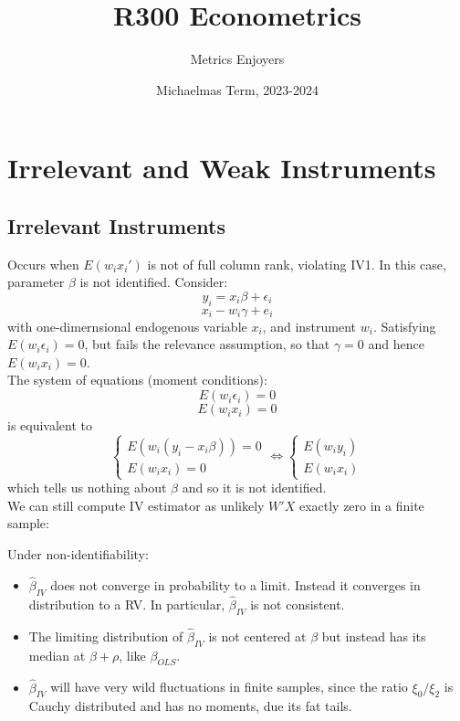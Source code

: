 \documentclass[DIV=14,titlepage=false]{scrreprt}
\title{%
R300 Econometrics}
\author{Metrics Enjoyers}
\date{Michaelmas Term, 2023-2024}
\begin{document}
\chapter{Irrelevant and Weak Instruments}

\section{Irrelevant Instruments}
Occurs when \(E(w_ix_i')\) is not of full column rank, violating IV1.
In this case, parameter \(\beta\) is not identified. Consider:
\[y_i=x_i\beta+\epsilon_i\]
\[x_i-w_i\gamma+e_i\]
with one-dimernsional endogenous variable \(x_i\), and instrument \(w_i\).
Satisfying \(E(w_i\epsilon_i)=0\), but fails the relevance assumption, so that \(\gamma=0\) and hence \(E(w_ix_i)=0\).
\\ The system of equations (moment conditions):
\[E(w_i\epsilon_i)=0\]
\[E(w_ix_i)=0\]
is equivalent to
\[\begin{cases} E(w_i(y_i-x_i\beta))=0 \\ E(w_ix_i)=0 \end{cases} \iff \begin{cases}E(w_iy_i) \\ E(w_ix_i)\end{cases}\]
which tells us nothing about \(\beta\) and so it is not identified.
\\
We can still compute IV estimator as unlikely \(W'X\) exactly zero in a finite sample:
\vspace{5mm}
\begin{prop}
    Under non-identifiability:
    \begin{itemize}
        \item \(\hat\beta_{IV}\) does not converge in probability to a limit. Instead it converges in distribution to a RV. In particular, \(\hat\beta_{IV}\) is not consistent.
        \item The limiting distribution of \(\hat\beta_{IV}\) is not centered at \(\beta\) but instead has its median at \(\beta+\rho\), like \(\beta_{OLS}\).
        \item \(\hat \beta_{IV}\) will have very wild fluctuations in finite samples, since the ratio \(\xi_0/\xi_2\) is Cauchy distributed and has no moments, due its fat tails.
    \end{itemize}
\end{prop}
\end{document}
